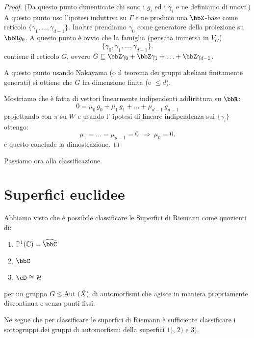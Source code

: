 \begin{proof}
    (Da questo punto dimenticate chi sono i $g_i$ ed i $\gamma_i$ e ne definiamo di nuovi.)
    A questo punto uso l'ipotesi induttiva su $\Gamma$ e ne produco una $\bbZ$-base come reticolo $\{\gamma_1, \ldots, \gamma_{d-1}\}$.
    Inoltre prendiamo $\gamma_0$ come generatore della proiezione su $\bbR g_0$.
    A questo punto è ovvio che la famiglia (pensata immersa in $V_G$)
    $$
    \{\gamma_0,\gamma_1,\ldots,\gamma_{d-1}\}.
    $$
    contiene il reticolo $G$, ovvero $G \sqsubseteq \bbZ \gamma_0 + \bbZ \gamma_1 + \ldots + \bbZ \gamma_{d-1}$.

    A questo punto usando Nakayama (o il teorema dei gruppi abeliani finitamente generati) si ottiene che $G$ ha dimensione finita (e $\le d$).

    Mostriamo che è fatta di vettori linearmente indipendenti addirittura su $\bbR$:
    $$
    0=\mu_0\, g_0+\mu_1\, g_1+\ldots+\mu_{d-1}\, g_{d-1}
    $$
    projettando con $\pi$ su $W$ e usando l' ipotesi di lineare indipendenza sui $\{\gamma_i\}$ ottengo:
    $$
    \mu_1=\ldots=\mu_{d-1}=0\ \ \Rightarrow\  \mu_0=0.
    $$
    e questo conclude la dimostrazione.
\end{proof}

Passiamo ora alla classificazione.



\section{Superfici euclidee}
Abbiamo visto che è possibile classificare le Superfici di Riemann come quozienti di:
\begin{enumerate}
\item $\mathbb{P}^1(\mathbb{C})=\hat{\bbC}$
\item $\bbC$
\item $\cD \cong \mathcal{H}$
\end{enumerate}
per un gruppo $G\le\text{Aut }(\tilde{X})$ di automorfismi che agisce in maniera propriamente discontinua e senza punti fissi.

Ne segue che per classificare le superfici di Riemann è sufficiente classificare i sottogruppi dei gruppi di automorfismi della superfici $1)$, $2)$ e $3)$.

